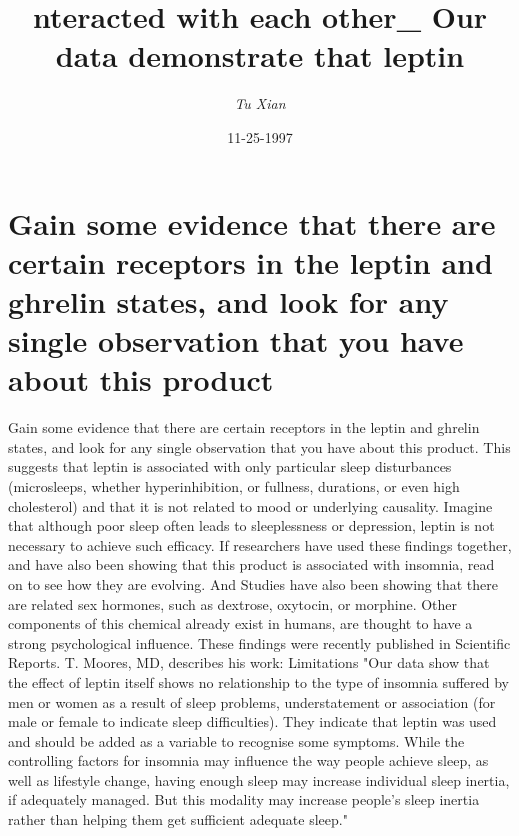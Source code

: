 \documentclass{article}%
\title{nteracted with each other\_ Our data demonstrate that leptin}%
\author{\textit{Tu Xian}}%
\date{11-25-1997}%
\begin{document}
%
\normalsize%
\maketitle%
\section{Gain some evidence that there are certain receptors in the leptin and ghrelin states, and look for any single observation that you have about this product}%
\label{sec:Gainsomeevidencethattherearecertainreceptorsintheleptinandghrelinstates,andlookforanysingleobservationthatyouhaveaboutthisproduct}%
Gain some evidence that there are certain receptors in the leptin and ghrelin states, and look for any single observation that you have about this product. This suggests that leptin is associated with only particular sleep disturbances (microsleeps, whether hyperinhibition, or fullness, durations, or even high cholesterol) and that it is not related to mood or underlying causality. Imagine that although poor sleep often leads to sleeplessness or depression, leptin is not necessary to achieve such efficacy.\newline%
If researchers have used these findings together, and have also been showing that this product is associated with insomnia, read on to see how they are evolving.\newline%
And\newline%
Studies have also been showing that there are related sex hormones, such as dextrose, oxytocin, or morphine. Other components of this chemical already exist in humans, are thought to have a strong psychological influence.\newline%
These findings were recently published in Scientific Reports.\newline%
T. Moores, MD, describes his work:\newline%
Limitations\newline%
"Our data show that the effect of leptin itself shows no relationship to the type of insomnia suffered by men or women as a result of sleep problems, understatement or association (for male or female to indicate sleep difficulties). They indicate that leptin was used and should be added as a variable to recognise some symptoms.\newline%
While the controlling factors for insomnia may influence the way people achieve sleep, as well as lifestyle change, having enough sleep may increase individual sleep inertia, if adequately managed. But this modality may increase people's sleep inertia rather than helping them get sufficient adequate sleep."\newline%
\end{document}
